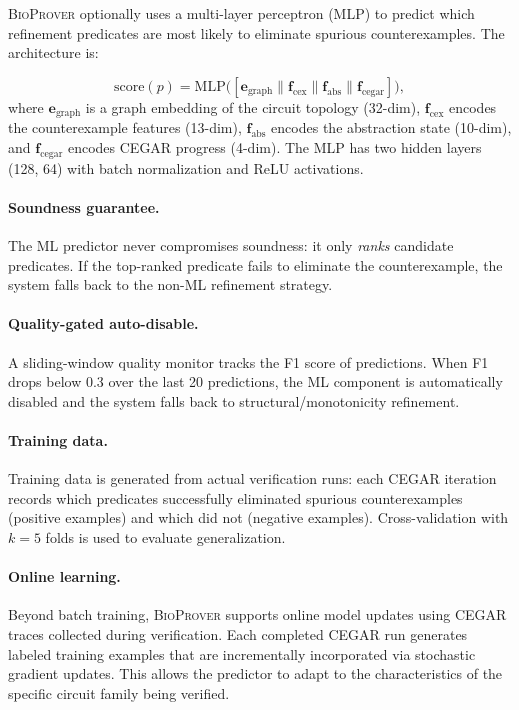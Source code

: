 \documentclass[11pt]{article}
\newcommand{\bioprover}{\textsc{BioProver}}
\newcommand{\cegar}{\textsc{CEGAR}}
\begin{document}
\bioprover{} optionally uses a multi-layer perceptron (MLP) to
predict which refinement predicates are most likely to eliminate
spurious counterexamples. The architecture is:

\begin{equation}
  \text{score}(p) = \text{MLP}\!\big(
    [\mathbf{e}_{\text{graph}} \| \mathbf{f}_{\text{cex}} \|
     \mathbf{f}_{\text{abs}} \| \mathbf{f}_{\text{cegar}}]\big),
\end{equation}
where $\mathbf{e}_{\text{graph}}$ is a graph embedding of the circuit
topology (32-dim), $\mathbf{f}_{\text{cex}}$ encodes the
counterexample features (13-dim), $\mathbf{f}_{\text{abs}}$ encodes
the abstraction state (10-dim), and $\mathbf{f}_{\text{cegar}}$
encodes \cegar{} progress (4-dim). The MLP has two hidden layers
(128, 64) with batch normalization and ReLU activations.

\paragraph{Soundness guarantee.}
The ML predictor never compromises soundness: it only \emph{ranks}
candidate predicates. If the top-ranked predicate fails to eliminate
the counterexample, the system falls back to the non-ML refinement
strategy.

\paragraph{Quality-gated auto-disable.}
A sliding-window quality monitor tracks the F1 score of predictions.
When F1 drops below 0.3 over the last 20 predictions, the ML
component is automatically disabled and the system falls back to
structural/monotonicity refinement.

\paragraph{Training data.}
Training data is generated from actual verification runs: each
\cegar{} iteration records which predicates successfully eliminated
spurious counterexamples (positive examples) and which did not
(negative examples). Cross-validation with $k=5$ folds is used to
evaluate generalization.

\paragraph{Online learning.}
Beyond batch training, \bioprover{} supports online model updates
using \cegar{} traces collected during verification. Each completed
\cegar{} run generates labeled training examples that are
incrementally incorporated via stochastic gradient updates. This
allows the predictor to adapt to the characteristics of the
specific circuit family being verified.
\end{document}

